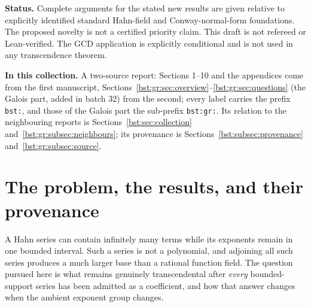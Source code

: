 \documentclass[11pt,letterpaper]{article}
\theoremstyle{definition}
\theoremstyle{remark}
\newcommand{\R}{\mathbb R}
\newcommand{\C}{\mathbb C}
\newcommand{\No}{\mathbf{No}}
\newcommand{\FF}[2]{\mathcal F_{#2}(#1)}
\begin{document}
\begin{titlepage}
\begin{abstract}
A second part, from a second manuscript, develops the Galois theory of
$\FF{\C}G$ and $\FF{\R}G$, which are also the fraction fields of the
canonical omnific subrings at the scale $G$. For divisible $G$ there is an
exact rank dichotomy: without an order unit $\FF{\C}G$ is algebraically
closed and $\FF{\R}G$ real closed; with one, every product of at most
continuum many finite groups is a Galois group over $\FF{\C}G$ inside the
ambient Hahn field, with explicit independent radical towers and an
explicit $S_m$ family. Cofinal inclusions of exponent groups preserve every
finite Galois extension, while noncofinal ones split every finite
extension after scalar extension; an explicit countable tower inside
$\No[i]$ repeats this.
\end{abstract}
\vfill
\noindent\small\textbf{Status.} Complete arguments for the stated new results are given relative
to explicitly identified standard Hahn-field and Conway-normal-form foundations.
The proposed novelty is not a certified priority claim. This draft is not refereed
or Lean-verified. The GCD application is explicitly conditional and is not used
in any transcendence theorem.

\smallskip
\noindent\textbf{In this collection.} A two-source report: Sections 1--10 and
the appendices come from the first manuscript, Sections~\ref{bst:gr:sec:overview}--\ref{bst:gr:sec:questions}
(the Galois part, added in batch 32) from the second; every label carries
the prefix \texttt{bst:}, and those of the Galois part the sub-prefix
\texttt{bst:gr:}. Its relation to the neighbouring reports is
Sections~\ref{bst:sec:collection} and~\ref{bst:gr:subsec:neighbours}; its
provenance is Sections~\ref{bst:subsec:provenance} and~\ref{bst:gr:subsec:source}.
\end{titlepage}
\hypersetup{pageanchor=true}
\begingroup
\small
\setlength{\parskip}{0pt}
\renewcommand{\baselinestretch}{0.95}\selectfont
\tableofcontents
\endgroup
\clearpage

\section{The problem, the results, and their provenance}\label{bst:sec:intro}

A Hahn series can contain infinitely many terms while its exponents remain in
one bounded interval. Such a series is not a polynomial, and adjoining all
such series produces a much larger base than a rational function field.
The question pursued here is what remains genuinely transcendental after
\emph{every} bounded-support series has been admitted as a coefficient, and
how that answer changes when the ambient exponent group changes.
\end{document}
